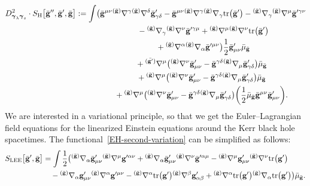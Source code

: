\documentclass[pdftex]{sigma}
\def\mbo#1{\boldsymbol{#1}}%
\def\grad{{\nabla}}%
\newcommand{\leftexp}[2]{{\vphantom{#2}}^{#1}{#2}}
\def\halb{\frac{1}{2}}%
\def \gm{\gamma}
\def \a{\alpha}
\def \b {\beta}
\renewcommand{\gg}{{\bf g}}
\newcommand{\bgg}{{\bar{\bf g}}}
\renewcommand{\a}{\alpha}
\renewcommand{\b}{\beta}
\renewcommand{\d}{\delta}
\newcommand{\la}{\lambda}
\numberwithin{equation}{section}
\begin{document}
\begin{gather}
D^2_{\mbo{\gamma}_\la \mbo{\gamma}_s} \cdot S_{\text{H}} \bigl[\bgg'', \bgg', \bgg\bigr] := \int
\bigl( \bgg^{\mu \nu} \leftexp{(\bar{\gg})}{\grad}^\gm \leftexp{(\bar{\gg})}{\grad}^\d \bgg'_{\gm \d} - \bgg^{\mu \nu} \leftexp{(\bar{\gg})}{\grad}^\gm \leftexp{(\bar{\gg})}{\grad}_\gm {\rm tr} \bigl(\bgg'\bigr)- \leftexp{(\bar{\gg})}{\grad}_\gm \leftexp{(\bar{\gg})}{\grad}^\mu \bgg'^{\gm \nu}
\notag\\
 \hphantom{D^2_{\mbo{\gamma}_\la \mbo{\gamma}_s} \cdot S_{\text{H}} \bigl[\bgg'', \bgg', \bgg\bigr] := \int\bigl(}{}
- \leftexp{(\bar{\gg})}{\grad}_\gm \leftexp{(\bar{\gg})}{\grad}^\nu \bgg'^{\gm \mu}
+ \leftexp{(\bar{\gg})}{\grad}^\mu \leftexp{(\bar{\gg})}{\grad}^\nu {\rm tr}\bigl(\bgg '\bigr) \notag\\
 \hphantom{D^2_{\mbo{\gamma}_\la \mbo{\gamma}_s} \cdot S_{\text{H}} \bigl[\bgg'', \bgg', \bgg\bigr] := \int\bigl(}{}
+ \leftexp{(\bar{\gg})}{\grad}^\a \leftexp{(\bar{\gg})}{\grad}_\a \bgg'^{\mu \nu} \bigr) \halb \bgg'_{\mu \nu} \bar{\mu}_\bgg \notag\\
 \hphantom{D^2_{\mbo{\gamma}_\la \mbo{\gamma}_s} \cdot S_{\text{H}} \bigl[\bgg'', \bgg', \bgg\bigr] :=\int}{}
 + \leftexp{(\bar{\gg'})}{\grad}^\mu\bigl( \leftexp{(\bar{\gg})}{\grad}^\nu \bgg'_{\mu \nu} - \bgg^{\gm \d} \leftexp{(\bar{\gg})}{\grad}_\mu \bgg'_{\gm \d}\bigr) \bar{\mu}_{\bgg}
\notag\\
 \hphantom{D^2_{\mbo{\gamma}_\la \mbo{\gamma}_s} \cdot S_{\text{H}} \bigl[\bgg'', \bgg', \bgg\bigr] :=\int}{}
+ \leftexp{(\bar{\gg})}{\grad}^\mu \bigl(\leftexp{(\bar{\gg})}{\grad}^\nu \bgg'_{ \mu \nu} - \bgg^{\gm \d} \leftexp{(\bar{\gg})}{\grad}_\mu \bgg'_{\gm \d}\bigr) \bar{\mu}_\bgg \notag\\
 \hphantom{D^2_{\mbo{\gamma}_\la \mbo{\gamma}_s} \cdot S_{\text{H}} \bigl[\bgg'', \bgg', \bgg\bigr] :=\int}{}
 + \leftexp{(\bar{\gg})}{\grad}^\mu \bigl(\leftexp{(\bar{\gg})}{\grad}^\nu \bgg'_{\mu \nu} - \bgg^{\gm \d} \leftexp{(\bar{\gg})}{\grad}_\mu \bgg'_{ \gm \d}\bigr) \biggl(\halb \bar{\mu}_\bgg \bgg^{\mu \nu} \bgg'_{\mu \nu}\biggr).\label{EH-second-variation}
\end{gather}
We are interested in a variational principle, so that we get the Euler--Lagrangian field equations for the linearized Einstein equations around the Kerr black hole spacetimes. The functional~\eqref{EH-second-variation} can be simplified as follows:
\begin{align}\label{LG-Lagrangian}
S_{\text{LEE}}\bigl[\bar{\gg}', \bar{\gg}\bigr] &{}= \int \halb \bigl(\leftexp{(\bar{\gg})}{\grad}_\a \bar{\gg}'_{\mu \nu} \leftexp{(\bar{\gg})}{\grad}^\mu \gg'^{\a \nu} + \leftexp{(\bar{\gg})}{\grad}_\a \bar{\gg}'_{\mu \nu} \leftexp{(\bar{\gg})}{\grad}^\nu \bar{\gg}'^{\a \mu} - \leftexp{(\bar{\gg})}{\grad}^\mu \gg'_{\mu \nu} \leftexp{(\bar{\gg})}{\grad}^\nu {\rm tr} \bigl(\gg'\bigr)\\
&\quad{} - \leftexp{(\bar{\gg})}{\grad}_\a \gg'_{\mu \nu} \leftexp{(\bar{\gg})}{\grad}^\a \gg'^{\mu \nu}
- \leftexp{(\bar{\gg})}{\grad}^\a {\rm tr} \bigl(\gg'\bigr) \leftexp{(\bar{\gg})}{\grad}^\b \gg'_{\a \b} +
\leftexp{(\bar{\gg})}{\grad} ^\a {\rm tr} \bigl(\gg'\bigr) \leftexp{(\bar{\gg})}{\grad}_\a {\rm tr}\bigl(\gg'\bigr) \bigr) \bar{\mu}_{\bar{\gg}}. \notag
\end{align}
\end{document}
